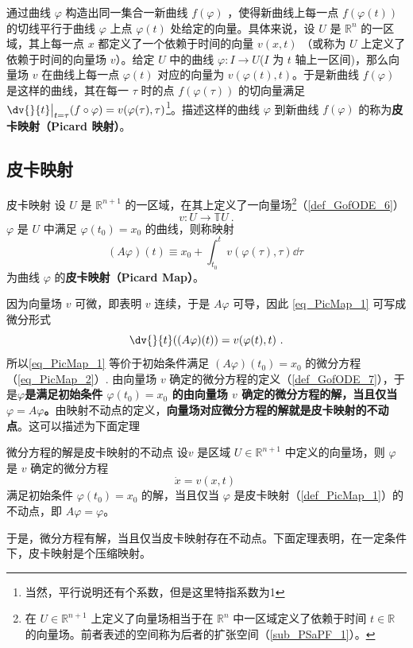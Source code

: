 
\cite{Arnold}通过曲线 $\varphi$ 构造出同一集合一新曲线 $f(\varphi)$ ，使得新曲线上每一点 $f(\varphi(t))$ 的切线平行于曲线 $\varphi$ 上点 $\varphi(t)$ 处给定的向量。具体来说，设 $U$ 是 $\mathbb R^n$ 的一区域，其上每一点 $x$ 都定义了一个依赖于时间的向量 $v(x,t)$ （或称为 $U$ 上定义了依赖于时间的向量场 $v$）。给定 $U$ 中的曲线 $\varphi:I\rightarrow U$($I$ 为 $t$ 轴上一区间)，那么向量场 $v$ 在曲线上每一点 $\varphi(t)$ 对应的向量为 $v(\varphi(t),t)$。于是新曲线 $f(\varphi)$ 是这样的曲线，其在每一 $\tau$ 时的点 $f(\varphi(\tau))$ 的切向量满足 $\dv{}{t}\big|_{t=\tau}(f\circ \varphi)=v(\varphi(\tau),\tau)$\footnote{当然，平行说明还有个系数，但是这里特指系数为1}。描述这样的曲线 $\varphi$ 到新曲线 $f(\varphi)$ 的称为\textbf{皮卡映射（Picard 映射）}。
\subsection{皮卡映射}
\begin{definition}{皮卡映射}\label{def_PicMap_1}
设 $U$ 是 $\mathbb R^{n+1}$ 的一区域，在其上定义了一向量场\footnote{在 $U\in\mathbb R^{n+1}$ 上定义了向量场相当于在 $\mathbb R^n$ 中一区域定义了依赖于时间 $t\in\mathbb R$ 的向量场。前者表述的空间称为后者的扩张空间（\autoref{sub_PSaPF_1}）。}（\autoref{def_GofODE_6}） 
\begin{equation}
v:U\rightarrow\mathbb TU~.
\end{equation}
$\varphi$ 是 $U$ 中满足 $\varphi(t_0)=x_0$ 的曲线，则称映射
\begin{equation}\label{eq_PicMap_1}
(A\varphi)(t)\equiv x_0+\int_{t_0}^{t}v(\varphi(\tau),\tau)\dd \tau~
\end{equation}
为曲线 $\varphi$ 的\textbf{皮卡映射（Picard Map）}。
\end{definition}

因为向量场 $v$ 可微，即表明 $v$ 连续，于是 $A\varphi$ 可导，因此 \autoref{eq_PicMap_1} 可写成微分形式
\begin{equation}\label{eq_PicMap_2}
\dv{}{t}((A\varphi)(t))=v(\varphi(t),t)~.
\end{equation}
所以\autoref{eq_PicMap_1} 等价于初始条件满足 $(A\varphi)(t_0)=x_0$ 的微分方程（\autoref{eq_PicMap_2}）. 由向量场 $v$ 确定的微分方程的定义（\autoref{def_GofODE_7}），于是\textbf{$\varphi$是满足初始条件 $\varphi(t_0)=x_0$ 的由向量场 $v$ 确定的微分方程的解，当且仅当 $\varphi=A\varphi$。}由映射不动点的定义，\textbf{向量场对应微分方程的解就是皮卡映射的不动点}。这可以描述为下面定理
\begin{theorem}{微分方程的解是皮卡映射的不动点}\label{the_PicMap_1}
设$v$ 是区域 $U\in\mathbb R^{n+1}$ 中定义的向量场，则 $\varphi$ 是 $v$ 确定的微分方程
\begin{equation}\label{eq_PicMap_3}
\dot x=v(x,t)~
\end{equation}
满足初始条件 $\varphi(t_0)=x_0$ 的解，当且仅当 $\varphi$ 是皮卡映射（\autoref{def_PicMap_1}）的不动点，即 $A\varphi=\varphi$。
\end{theorem}
于是，微分方程有解，当且仅当皮卡映射存在不动点。下面定理表明，在一定条件下，皮卡映射是个压缩映射。

